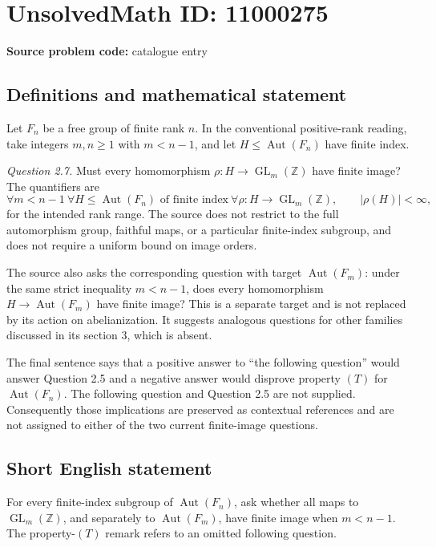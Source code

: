 \documentclass[11pt]{article}
\newcommand{\Z}{\mathbb{Z}}
\begin{document}
\section*{UnsolvedMath ID: 11000275}
\textbf{Source problem code:} catalogue entry
\subsection{Definitions and mathematical statement}
Let \(F_n\) be a free group of finite rank \(n\). In the conventional positive-rank reading, take integers \(m,n\geq1\) with \(m<n-1\), and let \(H\leq\operatorname{Aut}(F_n)\) have finite index.

\emph{Question 2.7.} Must every homomorphism \(\rho:H\to\operatorname{GL}_m(\Z)\) have finite image? The quantifiers are
\[
 \forall m<n-1\ \forall H\leq\operatorname{Aut}(F_n)
 \text{ of finite index}\ \forall\rho:H\to\operatorname{GL}_m(\Z),
 \qquad|\rho(H)|<\infty,
\]
for the intended rank range. The source does not restrict to the full automorphism group, faithful maps, or a particular finite-index subgroup, and does not require a uniform bound on image orders.

The source also asks the corresponding question with target \(\operatorname{Aut}(F_m)\): under the same strict inequality \(m<n-1\), does every homomorphism \(H\to\operatorname{Aut}(F_m)\) have finite image? This is a separate target and is not replaced by its action on abelianization. It suggests analogous questions for other families discussed in its section 3, which is absent.

The final sentence says that a positive answer to ``the following question'' would answer Question 2.5 and a negative answer would disprove property \((T)\) for \(\operatorname{Aut}(F_n)\). The following question and Question 2.5 are not supplied. Consequently those implications are preserved as contextual references and are not assigned to either of the two current finite-image questions.
\subsection{Short English statement}
For every finite-index subgroup of \(\operatorname{Aut}(F_n)\), ask whether all maps to \(\operatorname{GL}_m(\Z)\), and separately to \(\operatorname{Aut}(F_m)\), have finite image when \(m<n-1\). The property-\((T)\) remark refers to an omitted following question.
\end{document}

